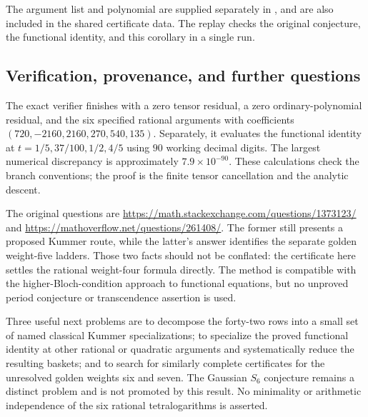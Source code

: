 The argument list and polynomial are supplied separately in
, and are also included in the
shared certificate data. The replay checks the original conjecture,
the functional identity, and this corollary in a single run.

\subsection{Verification, provenance, and further questions}

The exact verifier finishes with a zero tensor residual, a zero
ordinary-polynomial residual, and the six specified rational arguments
with coefficients $(720,-2160,2160,270,540,135)$. Separately, it evaluates
the functional identity at $t=1/5,37/100,1/2,4/5$ using $90$ working
decimal digits. The largest numerical discrepancy is approximately
$7.9\times10^{-90}$. These calculations check the branch conventions;
the proof is the finite tensor cancellation and the analytic descent.

The original questions are
\url{https://math.stackexchange.com/questions/1373123/} and
\url{https://mathoverflow.net/questions/261408/}.
The former still presents a proposed Kummer route, while the latter's
answer identifies the separate golden weight-five ladders. Those two
facts should not be conflated: the certificate here settles the rational
weight-four formula directly. The method is compatible with the
higher-Bloch-condition approach to functional equations, but no unproved
period conjecture or transcendence assertion is used.

Three useful next problems are to decompose the forty-two rows into a
small set of named classical Kummer specializations; to specialize the
proved functional identity at other rational or quadratic arguments and
systematically reduce the resulting baskets; and to search for similarly
complete certificates for the unresolved golden weights six and seven.
The Gaussian $S_6$ conjecture remains a distinct problem and is not
promoted by this result. No minimality or arithmetic independence of
the six rational tetralogarithms is asserted.
